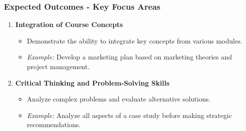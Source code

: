 \documentclass[aspectratio=169]{beamer}
\begin{document}
\begin{frame}[fragile]
    \frametitle{Expected Outcomes - Key Focus Areas}
    \begin{enumerate}
        \item \textbf{Integration of Course Concepts}
            \begin{itemize}
                \item Demonstrate the ability to integrate key concepts from various modules.
                \item \textit{Example:} Develop a marketing plan based on marketing theories and project management.
            \end{itemize}
        \item \textbf{Critical Thinking and Problem-Solving Skills}
            \begin{itemize}
                \item Analyze complex problems and evaluate alternative solutions.
                \item \textit{Example:} Analyze all aspects of a case study before making strategic recommendations.
            \end{itemize}
    \end{enumerate}
\end{frame}
\end{document}
